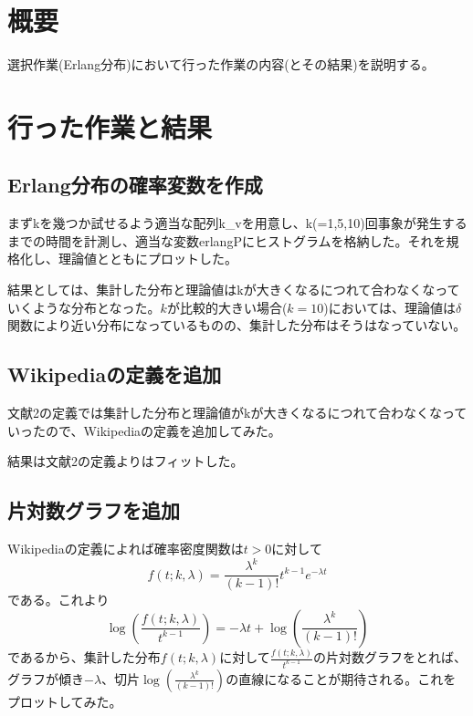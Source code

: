 \documentclass[a4paper,twoside]{jarticle}
\begin{document}

\maketitle

\section{概要}
選択作業(Erlang分布)において行った作業の内容(とその結果)を説明する。

\section{行った作業と結果}

\subsection{Erlang分布の確率変数を作成}\label{ss-erlang}
まずkを幾つか試せるよう適当な配列k\_vを用意し、k(=1,5,10)回事象が発生するまでの時間を計測し、適当な変数erlangPにヒストグラムを格納した。それを規格化し、理論値とともにプロットした。

結果としては、集計した分布と理論値はkが大きくなるにつれて合わなくなっていくような分布となった。$k$が比較的大きい場合($k=10$)においては、理論値は$\delta$関数により近い分布になっているものの、集計した分布はそうはなっていない。

\subsection{Wikipediaの定義を追加}\label{ss-wiki}
文献2の定義では集計した分布と理論値がkが大きくなるにつれて合わなくなっていったので、Wikipedia\cite{wiki-erlang}の定義を追加してみた。

結果は文献2の定義よりはフィットした。

\subsection{片対数グラフを追加}\label{ss-log}
Wikipedia\cite{wiki-erlang}の定義によれば確率密度関数は$t >0$に対して
\begin{equation}
  f(t;k,\lambda)=\frac{\lambda^{k}}{(k-1)!}t^{k-1}e^{-\lambda t}
\end{equation}
である。これより
\begin{equation}
  \log{\left(\frac{f(t;k,\lambda)}{t^{k-1}}\right)} = -\lambda t+\log{\left(\frac{\lambda^{k}}{(k-1)!}\right)}
\end{equation}
であるから、集計した分布$f(t;k,\lambda)$に対して$\frac{f(t;k,\lambda)}{t^{k-1}}$の片対数グラフをとれば、グラフが傾き$-\lambda$、切片$\log{\left(\frac{\lambda^{k}}{(k-1)!}\right)}$の直線になることが期待される。これをプロットしてみた。
\end{document}
